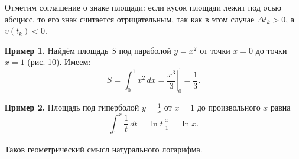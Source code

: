 \documentclass{article}
\begin{document}
Отметим соглашение о знаке площади: если кусок площади лежит под осью абсцисс, то его знак считается отрицательным, так как в этом случае \( \Delta t_k > 0 \), а \( v(t_k) < 0 \).

\textbf{Пример 1.} Найдём площадь \( S \) под параболой \( y = x^2 \) от точки \( x = 0 \) до точки \( x = 1 \) (рис. 10). Имеем:
\[
S = \int_{0}^{1} x^2 \, dx = \left. \frac{x^3}{3} \right|_{0}^{1} = \frac{1}{3}.
\]

\textbf{Пример 2.} Площадь под гиперболой \( y = \frac{1}{x} \) от \( x = 1 \) до произвольного \( x \) равна
\[
\int_{1}^{x} \frac{1}{t} \, dt = \ln t \Big|_{1}^{x} = \ln x.
\]

Таков геометрический смысл натурального логарифма.
\end{document}
